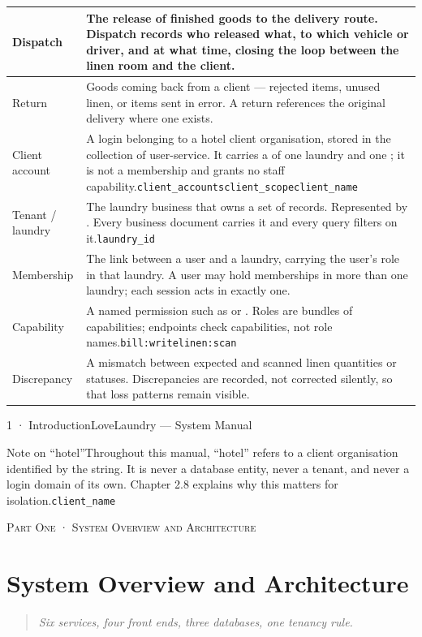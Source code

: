 \documentclass[11pt,a4paper,oneside]{book}
\begin{document}
\begin{center}
\begin{tabularx}{\linewidth}{|X|X|}
Dispatch & The release of finished goods to the delivery route. Dispatch records who released what, to which vehicle or driver, and at what time, closing the loop between the linen room and the client. \\ \hline
Return & Goods coming back from a client — rejected items, unused linen, or items sent in error. A return references the original delivery where one exists. \\ \hline
Client account & A login belonging to a hotel client organisation, stored in the  collection of user-service. It carries a  of one laundry and one ; it is not a membership and grants no staff capability.\texttt{client\_accounts}\texttt{client\_scope}\texttt{client\_name} \\ \hline
Tenant / laundry & The laundry business that owns a set of records. Represented by . Every business document carries it and every query filters on it.\texttt{laundry\_id} \\ \hline
Membership & The link between a user and a laundry, carrying the user's role in that laundry. A user may hold memberships in more than one laundry; each session acts in exactly one. \\ \hline
Capability & A named permission such as  or . Roles are bundles of capabilities; endpoints check capabilities, not role names.\texttt{bill:write}\texttt{linen:scan} \\ \hline
Discrepancy & A mismatch between expected and scanned linen quantities or statuses. Discrepancies are recorded, not corrected silently, so that loss patterns remain visible. \\ \hline
\end{tabularx}
\end{center}
1 · IntroductionLoveLaundry — System Manual

\begin{notebox}Note on “hotel”Throughout this manual, “hotel” refers to a client organisation identified by the  string. It is never a database entity, never a tenant, and never a login domain of its own. Chapter 2.8 explains why this matters for isolation.\texttt{client\_name}\end{notebox}
\textsc{\small\color{crimson}Part One · System Overview and Architecture}\par\medskip
\chapter{System Overview and Architecture}
\begin{quote}\itshape Six services, four front ends, three databases, one tenancy rule.\end{quote}
\end{document}
